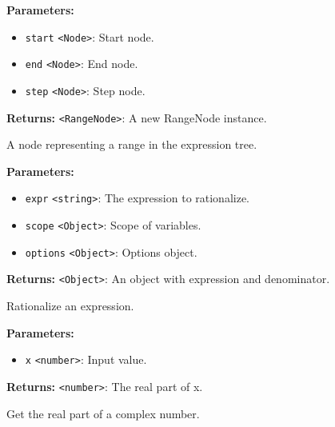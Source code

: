 \documentclass[12pt,a4paper]{article}
\begin{document}
\noindent \textbf{Parameters:}
\begin{itemize}
  \item \texttt{start} \texttt{<Node>}: Start node.
  \item \texttt{end} \texttt{<Node>}: End node.
  \item \texttt{step} \texttt{<Node>}: Step node.
\end{itemize}

\noindent \textbf{Returns:} \texttt{<RangeNode>}: A new RangeNode instance.

\noindent A node representing a range in the expression tree.

\vspace{5mm}
\noindent {}


\noindent \textbf{Parameters:}
\begin{itemize}
  \item \texttt{expr} \texttt{<string>}: The expression to rationalize.
  \item \texttt{scope} \texttt{<Object>}: Scope of variables.
  \item \texttt{options} \texttt{<Object>}: Options object.
\end{itemize}

\noindent \textbf{Returns:} \texttt{<Object>}: An object with expression and denominator.

\noindent Rationalize an expression.

\vspace{5mm}
\noindent {}


\noindent \textbf{Parameters:}
\begin{itemize}
  \item \texttt{x} \texttt{<number>}: Input value.
\end{itemize}

\noindent \textbf{Returns:} \texttt{<number>}: The real part of x.

\noindent Get the real part of a complex number.

\vspace{5mm}
\noindent {}\vspace{4mm}
\end{document}
